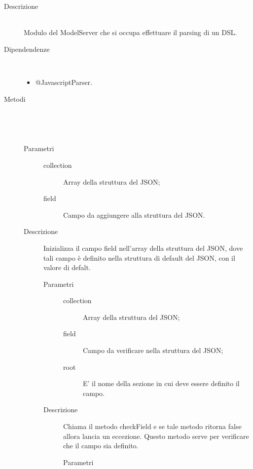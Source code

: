 \begin{description}
 \item[Descrizione] \hfill \\
  Modulo del ModelServer che si occupa effettuare il parsing di un DSL.
 \item[Dipendendenze] \hfill \\
 \begin{itemize}
  \item{@JavascriptParser}.
 \end{itemize}
  
 \item[Metodi] \hfill \\
 \begin{mldescription}
 \mlitem[addField] \hfill \\ 
 \begin{description}
     		\item[Parametri] \hfill
     			\begin{description}
     				\item[collection]
     				Array della struttura del JSON;
     				\item[field]
     				Campo da aggiungere alla struttura del JSON.
     			\end{description}
     		\item[Descrizione]
     		Inizializza il campo field nell'array della struttura del JSON, dove tali campo è definito nella struttura di default del JSON, con il valore di defalt.
 \mlitem[checkFieldThrow] \hfill \\
 \begin{description}
     		\item[Parametri] \hfill
     			\begin{description}
     				\item[collection]
     				Array della struttura del JSON;
     				\item[field]
     				Campo da verificare nella struttura del JSON;
     				\item[root]
     				E' il nome della sezione in cui deve essere definito il campo.
     			\end{description}
     		\item[Descrizione]
     		Chiama il metodo checkField e se tale metodo ritorna false allora lancia un eccezione. Questo metodo serve per verificare che il campo  sia definito. 
 \mlitem[checkField] \hfill \\ 
 \begin{description}
     		\item[Parametri] \hfill

\end{description}
\end{description}
\end{description}
\end{mldescription}
\end{description}
